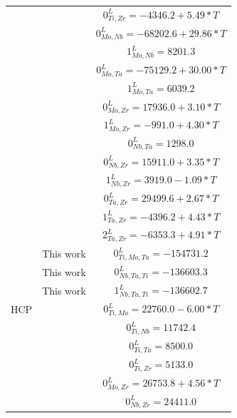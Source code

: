 \begin{longtable}[H]{ c c c }
                  & \cite{Kumar1994a} & $0^\textit{L}_{Ti,Zr} = -4346.2+5.49*T$\\
                  & \cite{Xiong2004} & $0^\textit{L}_{Mo,Nb} = -68202.6+29.86*T$\\
                  & \cite{Xiong2004} & $1^\textit{L}_{Mo,Nb} = 8201.3$\\
                  & \cite{Xiong2004} & $0^\textit{L}_{Mo,Ta} = -75129.2+30.00*T$\\
                  & \cite{Xiong2004} & $1^\textit{L}_{Mo,Ta} = 6039.2$\\
                  & \cite{Perez2003} & $0^\textit{L}_{Mo,Zr} = 17936.0+3.10*T$\\
                  & \cite{Perez2003} & $1^\textit{L}_{Mo,Zr} = -991.0+4.30*T$\\
                  & \cite{Xiong2004} & $0^\textit{L}_{Nb,Ta} = 1298.0$\\
                  & \cite{Guillermet1991} & $0^\textit{L}_{Nb,Zr} = 15911.0+3.35*T$\\
                  & \cite{Guillermet1991} & $1^\textit{L}_{Nb,Zr} = 3919.0-1.09*T$\\
                  & \cite{Guillermet1995} & $0^\textit{L}_{Ta,Zr} = 29499.6+2.67*T$\\
                  & \cite{Guillermet1995} & $1^\textit{L}_{Ta,Zr} = -4396.2+4.43*T$\\
                  & \cite{Guillermet1995} & $2^\textit{L}_{Ta,Zr} = -6353.3+4.91*T$\\
                  & This work & $0^\textit{L}_{Ti,Mo,Ta} = -154731.2$\\
                  & This work & $0^\textit{L}_{Nb,Ta,Ti} = -136603.3$\\
                  & This work & $1^\textit{L}_{Nb,Ta,Ti} = -136602.7$\\
          HCP & \cite{Ansara1998} & $0^\textit{L}_{Ti,Mo} = 22760.0-6.00*T$\\      
                  & \cite{Zhang2001} & $0^\textit{L}_{Ti,Nb} = 11742.4$\\
                  & \cite{Ansara1998} & $0^\textit{L}_{Ti,Ta} = 8500.0$\\
                  & \cite{Kumar1994a} & $0^\textit{L}_{Ti,Zr} = 5133.0$\\
                  & \cite{Perez2003} & $0^\textit{L}_{Mo,Zr} = 26753.8+4.56*T$\\
                  & \cite{Guillermet1991} & $0^\textit{L}_{Nb,Zr} = 24411.0$\\

\end{longtable}
